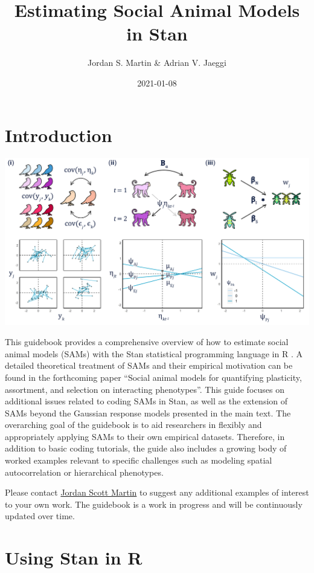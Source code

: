 \documentclass[
]{book}
\title{Estimating Social Animal Models in Stan}
\author{Jordan S. Martin \& Adrian V. Jaeggi}
\date{2021-01-08}
\begin{document}
\maketitle

{
\setcounter{tocdepth}{1}
\tableofcontents
}
\hypertarget{introduction}{%
\chapter*{Introduction}\label{introduction}}

\includegraphics{Fig 1 r1.png}

This guidebook provides a comprehensive overview of how to estimate social animal models (SAMs) with the Stan statistical programming language \citep{Stan} in R \citep{Rbase}. A detailed theoretical treatment of SAMs and their empirical motivation can be found in the forthcoming paper \citep{SAM} ``Social animal models for quantifying plasticity, assortment, and selection on interacting phenotypes''. This guide focuses on additional issues related to coding SAMs in Stan, as well as the extension of SAMs beyond the Gaussian response models presented in the main text. The overarching goal of the guidebook is to aid researchers in flexibly and appropriately applying SAMs to their own empirical datasets. Therefore, in addition to basic coding tutorials, the guide also includes a growing body of worked examples relevant to specific challenges such as modeling spatial autocorrelation or hierarchical phenotypes.

Please contact \href{mailto:jordan.martin@iem.uzh.ch?}{Jordan Scott Martin} to suggest any additional examples of interest to your own work. The guidebook is a work in progress and will be continuously updated over time.

\hypertarget{using-stan-in-r}{%
\chapter{Using Stan in R}\label{using-stan-in-r}}
\end{document}
